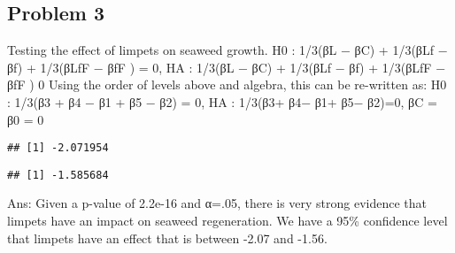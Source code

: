 \documentclass[
]{article}
\newenvironment{Shaded}{\begin{snugshade}}{\end{snugshade}}
\newcommand{\AttributeTok}[1]{\textcolor[rgb]{0.77,0.63,0.00}{#1}}
\newcommand{\DecValTok}[1]{\textcolor[rgb]{0.00,0.00,0.81}{#1}}
\newcommand{\FunctionTok}[1]{\textcolor[rgb]{0.00,0.00,0.00}{#1}}
\newcommand{\NormalTok}[1]{#1}
\newcommand{\OtherTok}[1]{\textcolor[rgb]{0.56,0.35,0.01}{#1}}
\newcommand{\SpecialCharTok}[1]{\textcolor[rgb]{0.00,0.00,0.00}{#1}}
\begin{document}
\hypertarget{problem-3}{%
\subsection{Problem 3}\label{problem-3}}

Testing the effect of limpets on seaweed growth. H0 : 1/3(βL − βC) +
1/3(βLf − βf) + 1/3(βLfF − βfF ) = 0, HA : 1/3(βL − βC) + 1/3(βLf − βf)
+ 1/3(βLfF − βfF ) 0 Using the order of levels above and algebra, this
can be re-written as: H0 : 1/3(β3 + β4 − β1 + β5 − β2) = 0, HA : 1/3(β3+
β4− β1+ β5− β2)=0, βC = β0 = 0

\begin{Shaded}
\end{Shaded}

\begin{verbatim}
## [1] -2.071954
\end{verbatim}

\begin{Shaded}
\end{Shaded}

\begin{verbatim}
## [1] -1.585684
\end{verbatim}

Ans: Given a p-value of 2.2e-16 and α=.05, there is very strong evidence
that limpets have an impact on seaweed regeneration. We have a 95\%
confidence level that limpets have an effect that is between -2.07 and
-1.56.
\end{document}
